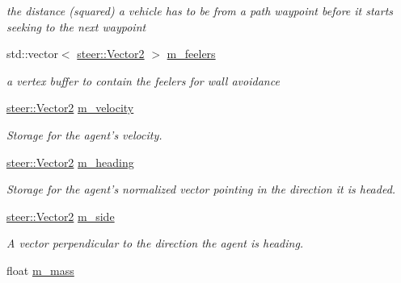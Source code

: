 \begin{DoxyCompactItemize}
\begin{DoxyCompactList}\small\item\em the distance (squared) a vehicle has to be from a path waypoint before it starts seeking to the next waypoint \end{DoxyCompactList}\item 
\hypertarget{classsteer_1_1_agent_ac7bc35e3b79fa41f74934b5c1f60513d}{std\-::vector$<$ \hyperlink{structsteer_1_1_vector2}{steer\-::\-Vector2} $>$ \hyperlink{classsteer_1_1_agent_ac7bc35e3b79fa41f74934b5c1f60513d}{m\-\_\-feelers}}\label{classsteer_1_1_agent_ac7bc35e3b79fa41f74934b5c1f60513d}

\begin{DoxyCompactList}\small\item\em a vertex buffer to contain the feelers for wall avoidance \end{DoxyCompactList}\item 
\hypertarget{classsteer_1_1_agent_a55b255a2c414feae7685766e559f50d0}{\hyperlink{structsteer_1_1_vector2}{steer\-::\-Vector2} \hyperlink{classsteer_1_1_agent_a55b255a2c414feae7685766e559f50d0}{m\-\_\-velocity}}\label{classsteer_1_1_agent_a55b255a2c414feae7685766e559f50d0}

\begin{DoxyCompactList}\small\item\em Storage for the agent's velocity. \end{DoxyCompactList}\item 
\hypertarget{classsteer_1_1_agent_a671f73d052bea058f989d51848073f8a}{\hyperlink{structsteer_1_1_vector2}{steer\-::\-Vector2} \hyperlink{classsteer_1_1_agent_a671f73d052bea058f989d51848073f8a}{m\-\_\-heading}}\label{classsteer_1_1_agent_a671f73d052bea058f989d51848073f8a}

\begin{DoxyCompactList}\small\item\em Storage for the agent's normalized vector pointing in the direction it is headed. \end{DoxyCompactList}\item 
\hypertarget{classsteer_1_1_agent_a9d823a2a11d22b8f83937d3b22814d97}{\hyperlink{structsteer_1_1_vector2}{steer\-::\-Vector2} \hyperlink{classsteer_1_1_agent_a9d823a2a11d22b8f83937d3b22814d97}{m\-\_\-side}}\label{classsteer_1_1_agent_a9d823a2a11d22b8f83937d3b22814d97}

\begin{DoxyCompactList}\small\item\em A vector perpendicular to the direction the agent is heading. \end{DoxyCompactList}\item 
\hypertarget{classsteer_1_1_agent_a46cd511eacd52f8ba6094160b3670145}{float \hyperlink{classsteer_1_1_agent_a46cd511eacd52f8ba6094160b3670145}{m\-\_\-mass}}\label{classsteer_1_1_agent_a46cd511eacd52f8ba6094160b3670145}


\end{DoxyCompactItemize}
